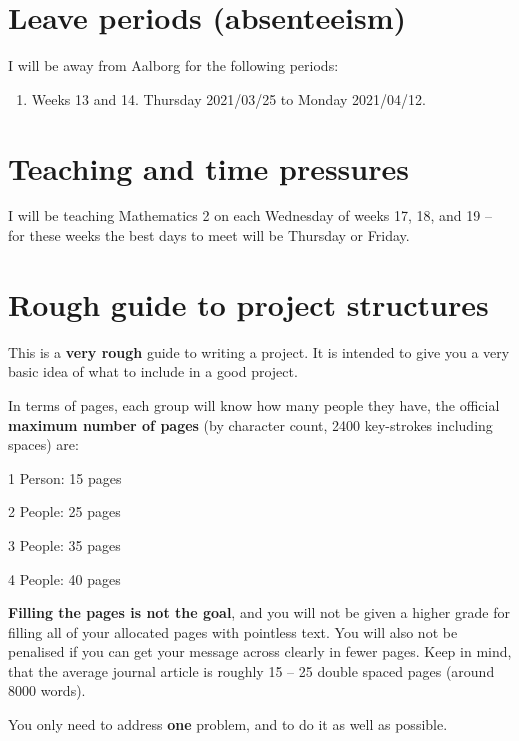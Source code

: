 \documentclass[
]{book}
\providecommand{\tightlist}{%
  \setlength{\itemsep}{0pt}\setlength{\parskip}{0pt}}
\begin{document}
\hypertarget{leave-periods-absenteeism}{%
\section{Leave periods (absenteeism)}\label{leave-periods-absenteeism}}

I will be away from Aalborg for the following periods:

\begin{enumerate}
\def\labelenumi{\arabic{enumi}.}
\tightlist
\item
  Weeks 13 and 14. Thursday 2021/03/25 to Monday 2021/04/12.
\end{enumerate}

\hypertarget{teaching-and-time-pressures}{%
\section{Teaching and time pressures}\label{teaching-and-time-pressures}}

I will be teaching Mathematics 2 on each Wednesday of weeks 17, 18, and
19 -- for these weeks the best days to meet will be Thursday or Friday.

\hypertarget{rough-guide-to-project-structures}{%
\section{Rough guide to project structures}\label{rough-guide-to-project-structures}}

This is a \textbf{very rough} guide to writing a project. It is intended to
give you a very basic idea of what to include in a good project.

In terms of pages, each group will know how many people they have, the
official \textbf{maximum number of pages} (by character count, 2400
key-strokes including spaces) are:

1 Person: 15 pages

2 People: 25 pages

3 People: 35 pages

4 People: 40 pages

\textbf{Filling the pages is not the goal}, and you will not be given a
higher grade for filling all of your allocated pages with pointless
text. You will also not be penalised if you can get your message across
clearly in fewer pages. Keep in mind, that the average journal article
is roughly 15 -- 25 double spaced pages (around 8000 words).

You only need to address \textbf{one} problem, and to do it as well as
possible.
\end{document}
